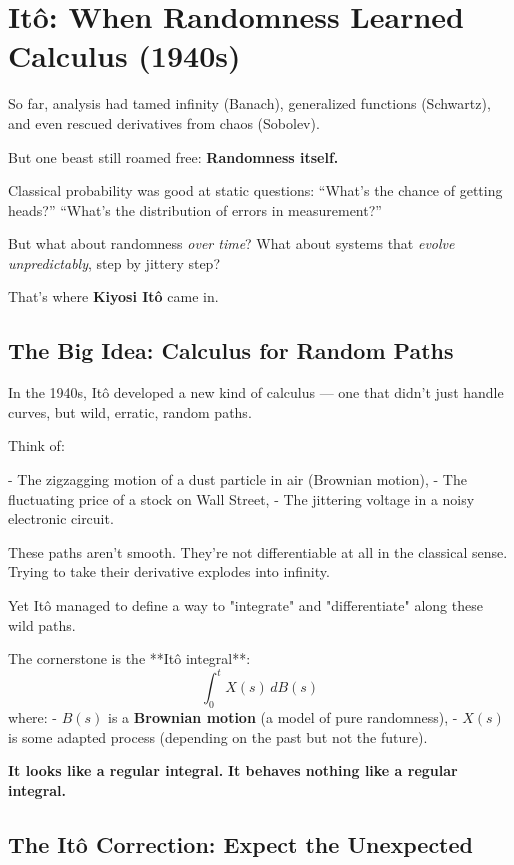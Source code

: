 \section{Itô: When Randomness Learned Calculus (1940s)}

So far, analysis had tamed infinity (Banach), generalized functions (Schwartz), and even rescued derivatives from chaos (Sobolev).

But one beast still roamed free:  
\textbf{Randomness itself.}

Classical probability was good at static questions:  
“What’s the chance of getting heads?”  
“What’s the distribution of errors in measurement?”

But what about randomness \textit{over time}?  
What about systems that \textit{evolve unpredictably}, step by jittery step?

That’s where \textbf{Kiyosi Itô} came in.

\subsection*{The Big Idea: Calculus for Random Paths}

In the 1940s, Itô developed a new kind of calculus — one that didn’t just handle curves, but wild, erratic, random paths.

Think of:

- The zigzagging motion of a dust particle in air (Brownian motion),
- The fluctuating price of a stock on Wall Street,
- The jittering voltage in a noisy electronic circuit.

These paths aren’t smooth.  
They're not differentiable at all in the classical sense.  
Trying to take their derivative explodes into infinity.

Yet Itô managed to define a way to "integrate" and "differentiate" along these wild paths.

The cornerstone is the **Itô integral**:
\[
\int_0^t X(s) \, dB(s)
\]
where:
- \( B(s) \) is a \textbf{Brownian motion} (a model of pure randomness),
- \( X(s) \) is some adapted process (depending on the past but not the future).

\smallskip

\textbf{It looks like a regular integral.}  
\textbf{It behaves nothing like a regular integral.}

\subsection*{The Itô Correction: Expect the Unexpected}

